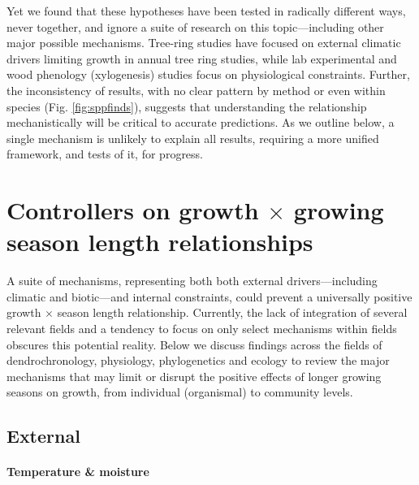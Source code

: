 \documentclass[11pt]{article}
\begin{document}
Yet we found that these hypotheses have been tested in radically different ways, never together, and ignore a suite of research on this topic---including other major possible mechanisms. Tree-ring studies have focused on external climatic drivers limiting growth in annual tree ring studies, while lab experimental and wood phenology (xylogenesis) studies focus on physiological constraints. Further, the inconsistency of results, with no clear pattern by method or even within species (Fig. \ref{fig:sppfinds}), suggests that understanding the relationship mechanistically will be critical to accurate predictions. As we outline below, a single mechanism is unlikely to explain all results, requiring a more unified framework, and tests of it, for progress. 
 
\section*{Controllers on growth $\times$ growing season length relationships}

A suite of mechanisms, representing both both external drivers---including climatic and biotic---and internal constraints, could prevent a universally positive growth $\times$ season length relationship. Currently, the lack of integration of several relevant fields and a tendency to focus on only select mechanisms within fields obscures this potential reality. Below we discuss findings across the fields of dendrochronology, physiology, phylogenetics and ecology to review the major mechanisms that may limit or disrupt the positive effects of longer growing seasons on growth, from individual (organismal) to community levels. 

\subsection*{External}

\paragraph{Temperature \& moisture} %
\end{document}
